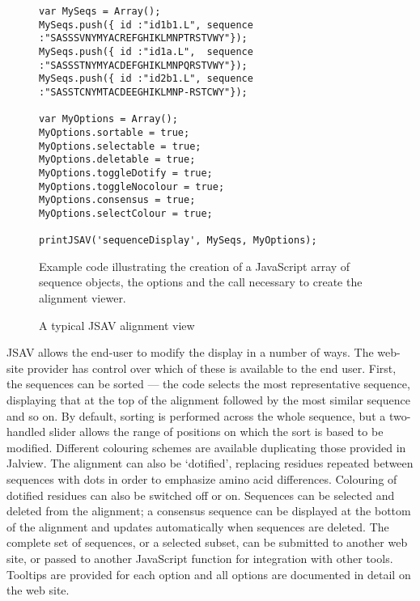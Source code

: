 \documentclass{article}
\begin{document}
\begin{figure}
\footnotesize
\begin{verbatim}
var MySeqs = Array();
MySeqs.push({ id :"id1b1.L", sequence :"SASSSVNYMYACREFGHIKLMNPTRSTVWY"});
MySeqs.push({ id :"id1a.L",  sequence :"SASSSTNYMYACDEFGHIKLMNPQRSTVWY"});
MySeqs.push({ id :"id2b1.L", sequence :"SASSTCNYMTACDEEGHIKLMNP-RSTCWY"});

var MyOptions = Array();
MyOptions.sortable = true;
MyOptions.selectable = true;
MyOptions.deletable = true;
MyOptions.toggleDotify = true;
MyOptions.toggleNocolour = true;
MyOptions.consensus = true;
MyOptions.selectColour = true;

printJSAV('sequenceDisplay', MySeqs, MyOptions);
\end{verbatim}
\caption{\label{fig:code}Example code illustrating the creation of a
JavaScript array of sequence objects, the options and the call
necessary to create the alignment viewer.}
\end{figure}

\begin{figure}
\caption{\label{fig:demo}A typical JSAV alignment view}
\end{figure}

JSAV allows the end-user to modify the display in a number of ways.
The web-site provider has control over which of these is available to
the end user. First, the sequences can be sorted --- the code selects
the most representative sequence, displaying that at the top of the
alignment followed by the most similar sequence and so on. By default,
sorting is performed across the whole sequence, but a two-handled
slider allows the range of positions on which the sort is based to be
modified. Different colouring schemes are available duplicating those
provided in Jalview. The alignment can also be `dotified', replacing
residues repeated between sequences with dots in order to emphasize
amino acid differences. Colouring of dotified residues can also be
switched off or on. Sequences can be selected and deleted from the
alignment; a consensus sequence can be displayed at the bottom of the
alignment and updates automatically when sequences are deleted. The
complete set of sequences, or a selected subset, can be submitted to
another web site, or passed to another JavaScript function for
integration with other tools. Tooltips are provided for each option
and all options are documented in detail on the web site.
\end{document}
